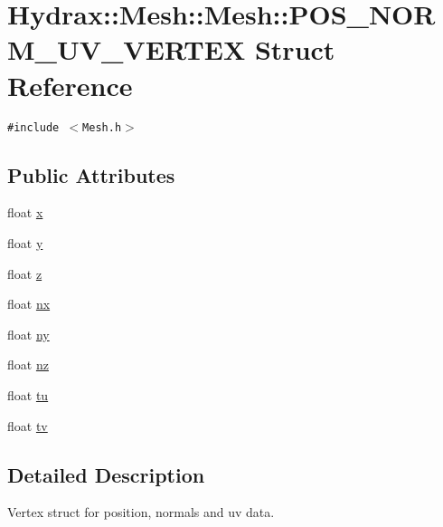 \hypertarget{struct_hydrax_1_1_mesh_1_1_p_o_s___n_o_r_m___u_v___v_e_r_t_e_x}{
\section{Hydrax::Mesh::Mesh::POS\_\-NORM\_\-UV\_\-VERTEX Struct Reference}
\label{struct_hydrax_1_1_mesh_1_1_p_o_s___n_o_r_m___u_v___v_e_r_t_e_x}
}
{\tt \#include $<$Mesh.h$>$}

\subsection*{Public Attributes}
\begin{CompactItemize}
\item 
float \hyperlink{struct_hydrax_1_1_mesh_1_1_p_o_s___n_o_r_m___u_v___v_e_r_t_e_x_3fd2778d7b1557d3ffe2cca87821050e}{x}
\item 
float \hyperlink{struct_hydrax_1_1_mesh_1_1_p_o_s___n_o_r_m___u_v___v_e_r_t_e_x_bdf65317315309866cf29cc769877eb8}{y}
\item 
float \hyperlink{struct_hydrax_1_1_mesh_1_1_p_o_s___n_o_r_m___u_v___v_e_r_t_e_x_411e0a89b12a32150632eb663aef89a1}{z}
\item 
float \hyperlink{struct_hydrax_1_1_mesh_1_1_p_o_s___n_o_r_m___u_v___v_e_r_t_e_x_6000dc953245d0f42fa74da4b93887aa}{nx}
\item 
float \hyperlink{struct_hydrax_1_1_mesh_1_1_p_o_s___n_o_r_m___u_v___v_e_r_t_e_x_43746202bf4ed8a4e552c02dbf294001}{ny}
\item 
float \hyperlink{struct_hydrax_1_1_mesh_1_1_p_o_s___n_o_r_m___u_v___v_e_r_t_e_x_e74cd37e00d1d1785b413f3ed37bef03}{nz}
\item 
float \hyperlink{struct_hydrax_1_1_mesh_1_1_p_o_s___n_o_r_m___u_v___v_e_r_t_e_x_3ab8e346c7ab8c49f43f339aa8a6b3d3}{tu}
\item 
float \hyperlink{struct_hydrax_1_1_mesh_1_1_p_o_s___n_o_r_m___u_v___v_e_r_t_e_x_d2c28d211d1bd8a22dd53fdba0136b70}{tv}
\end{CompactItemize}


\subsection{Detailed Description}
Vertex struct for position, normals and uv data. 

